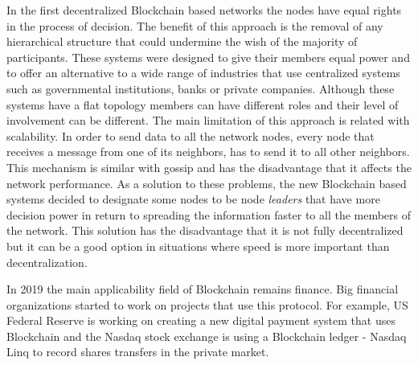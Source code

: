 In the first decentralized Blockchain based networks the nodes have equal rights in the process of decision. The benefit of this approach is the removal of any hierarchical structure that could undermine the wish of the majority of participants. These systems were designed to give their members equal power and to offer an alternative to a wide range of industries that use centralized systems such as governmental institutions, banks or private companies. Although these systems have a flat topology members can have different roles and their level of involvement can be different. The main limitation of this approach is related with scalability. In order to send data to all the network nodes, every node that receives a message from one of its neighbors, has to send it to all other neighbors. This mechanism is similar with gossip and has the disadvantage that it affects the network performance. As a solution to these problems, the new Blockchain based systems decided to designate some nodes to be node \emph{leaders} that have more decision power in return to spreading the information faster to all the members of the network. This solution has the disadvantage that it is not fully decentralized but it can be a good option in situations where speed is more important than decentralization.

In 2019 the main applicability field of Blockchain remains finance. Big financial organizations started to work on projects that use this protocol. For example, US Federal Reserve is working on creating a new digital payment system that uses Blockchain and the Nasdaq stock exchange is using a Blockchain ledger - Nasdaq Linq to record shares transfers in the private market.

